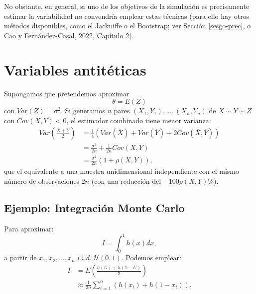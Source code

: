 \documentclass[
]{book}
\theoremstyle{break}
\theoremstyle{nonumberplain}
\begin{document}
No obstante, en general, si uno de los objetivos de la simulación es precisamente estimar la variabilidad no convendría emplear estas técnicas
(para ello hay otros métodos disponibles, como el Jackniffe o el Bootstrap; ver Sección \ref{sesgo-prec}, o Cao y Fernández-Casal, 2022, \href{https://rubenfcasal.github.io/book_remuestreo/prec-sesgo.html}{Capítulo 2}).

\hypertarget{variables-antituxe9ticas}{%
\section{Variables antitéticas}\label{variables-antituxe9ticas}}

Supongamos que pretendemos aproximar
\[\theta=E\left(  Z\right)\]
con \(Var\left( Z \right) = \sigma^{2}\).
Si generamos \(n\) pares
\(\left( X_{1},Y_{1}\right), ... ,\left( X_{n},Y_{n}\right)\)
de \(X\sim Y\sim Z\) con \(Cov\left( X,Y\right) < 0\),
el estimador combinado tiene menor varianza:
\[\begin{aligned}
    Var\left(  \frac{\overline{X}+\overline{Y}}{2}\right)   & =\frac{1}{4}\left(
    Var\left(  \overline{X}\right)  +Var\left(  \overline{Y}\right)  +2Cov\left(
    \overline{X},\overline{Y}\right)  \right) \\
    & =\frac{\sigma^{2}}{2n}+\frac{1}{2n}Cov\left(  X,Y\right) \\
    & =\frac{\sigma^{2}}{2n}\left(  1+\rho \left(  X,Y\right)  \right),
\end{aligned}\]
que el equivalente a una muestra unidimensional independiente con el
mismo número de observaciones \(2n\) (con una reducción del
\(-100\rho \left( X,Y\right) \%\)).

\hypertarget{ejemplo-integraciuxf3n-monte-carlo}{%
\subsection{Ejemplo: Integración Monte Carlo}\label{ejemplo-integraciuxf3n-monte-carlo}}

Para aproximar:
\[I=\int_{0}^{1}h\left(  x\right) dx,\]
a partir de \(x_{1},x_{2},\ldots,x_{n}\) \(i.i.d.\)
\(\mathcal{U}\left(0,1\right)\).
Podemos emplear:
\[\begin{aligned}
    I  & =E\left(  \frac{h\left(  U\right)  +h\left(  1-U\right)  }{2}\right) \\
    & \approx \frac{1}{2n}\sum \limits_{i=1}^{n}\left(  h\left(  x_{i}\right)
    +h\left(  1-x_{i}\right)  \right).
\end{aligned}\]
\end{document}
